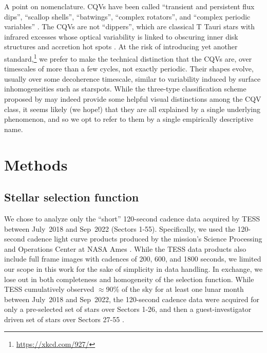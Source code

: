 \documentclass[11pt,twocolumn,tighten]{aastex63}
\begin{document}
A point on nomenclature.  CQVs have been called ``transient and
persistent flux dips'', ``scallop shells'', ``batwings'',
\citep{2017AJ....153..152S,2018AJ....155...63S} ``complex rotators'',
\citep{2019ApJ...876..127Z,2022AJ....163..144G,2023ApJ...945..114P}
and ``complex periodic variables'' \citep{2023MNRAS.518.2921K}.  The
CQVs are not ``dippers'', which are classical T Tauri stars with
infrared excesses whose optical variability is linked to obscuring
inner disk structures and accretion hot spots
\citep{2014AJ....147...82C,2021ApJ...908...16R}.  At the risk of
introducing yet another
standard,\footnote{\url{https://xkcd.com/927/}} we prefer to make the
technical distinction that the CQVs are, over timescales of more than
a few cycles, not exactly periodic.  Their shapes evolve, usually over
some decoherence timescale, similar to variability induced by surface
inhomogeneities such as starspots.  While the three-type
classification scheme proposed by \citet{2017AJ....153..152S} may
indeed provide some helpful visual distinctions among the CQV class,
it seems likely (we hope!) that they are all explained by a single
underlying phenomenon, and so we opt to refer to them by a single
empirically descriptive name.




\section{Methods}
\label{sec:methods}

\subsection{Stellar selection function}
\label{subsec:selectionfn}

We chose to analyze only the ``short'' 120-second cadence data
acquired by TESS between July~2018 and Sep~2022 (Sectors 1-55).
Specifically, we used the 120-second cadence light curve products
produced by the mission's Science Processing and Operations Center at
NASA Ames \citep{2016SPIE.9913E..3EJ}.  While the TESS data products
also include full frame images with cadences of 200, 600, and 1800
seconds, we limited our scope in this work for the sake of simplicity
in data handling.  In exchange, we lose out in both completeness and
homogeneity of the selection function.  While TESS cumulatively
observed $\approx$90\% of the sky for at least one lunar month between
July~2018 and Sep~2022, the 120-second cadence data were acquired for
only a pre-selected set of stars over Sectors 1-26, and then a
guest-investigator driven set of stars over Sectors 27-55
\citep{2021PASP..133i5002F}.
\end{document}
